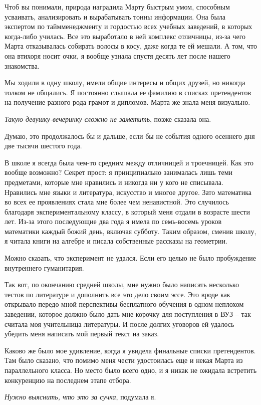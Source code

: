 \documentclass[
]{book}
\begin{document}
Чтоб вы понимали, природа наградила Марту быстрым умом, способным усваивать, анализировать и вырабатывать тонны информации. Она была экспертом по таймменеджменту и гордостью всех учебных заведений, в которых когда-либо училась. Все это выработало в ней комплекс отличницы, из-за чего Марта отказывалась собирать волосы в косу, даже когда те ей мешали. А том, что она втихоря носит очки, я вообще узнала спустя десять лет после нашего знакомства.

Мы ходили в одну школу, имели общие интересы и общих друзей, но никогда толком не общались. Я постоянно слышала ее фамилию в списках претендентов на получение разного рода грамот и дипломов. Марта же знала меня визуально.

\emph{Такую девушку-вечеринку сложно не заметить}, позже сказала она.

Думаю, это продолжалось бы и дальше, если бы не события одного осеннего дня две тысячи шестого года.

В школе я всегда была чем-то средним между отличницей и троечницей. Как это вообще возможно? Секрет прост: я принципиально занималась лишь теми предметами, которые мне нравились и никогда ни у кого не списывала. Нравились мне языки и литература, искусство и многое другое. Зато математика во всех ее проявлениях стала мне более чем ненавистной. Это случилось благодаря экспериментальному классу, в который меня отдали в возрасте шести лет. Из-за этого последующие два года я имела по семь-восемь уроков математики каждый божий день, включая субботу. Таким образом, сменив школу, я читала книги на алгебре и писала собственные рассказы на геометрии.

Можно сказать, что эксперимент не удался. Если его целью не было пробуждение внутреннего гуманитария.

Так вот, по окончанию средней школы, мне нужно было написать несколько тестов по литературе и дополнить все это дело своим эссе. Это вроде как открывало передо мной перспективы бесплатного обучения в одном неплохом заведении, которое должно было дать мне корочку для поступления в ВУЗ -- так считала моя учительница литературы. И после долгих уговоров ей удалось убедить меня написать мой первый текст на заказ.

Каково же было мое удивление, когда я увидела финальные списки претендентов. Там было сказано, что помимо меня чести удостоилась еще и некая Марта из параллельного класса. Но место было всего одно, и я никак не ожидала встретить конкуренцию на последнем этапе отбора.

\emph{Нужно выяснить, что это за сучка}, подумала я.
\end{document}
